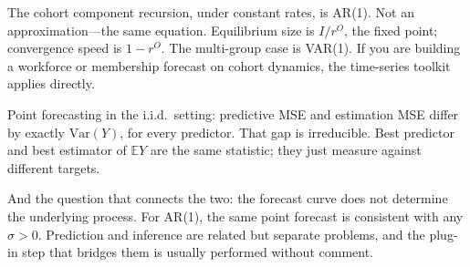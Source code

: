 \documentclass[a4paper,oneside,12pt]{extarticle}
\theoremstyle{plain}
\theoremstyle{definition}
\theoremstyle{remark}
\newcommand*{\E}{\mathbb{E}}
\begin{document}
The cohort component recursion, under constant rates, is AR(1). Not an
approximation---the same equation. Equilibrium size is $I/r^O$, the fixed
point; convergence speed is $1-r^O$. The multi-group case is VAR(1). If
you are building a workforce or membership forecast on cohort dynamics,
the time-series toolkit applies directly.

Point forecasting in the i.i.d.\ setting: predictive MSE and estimation
MSE differ by exactly $\mathrm{Var}(Y)$, for every predictor. That gap
is irreducible. Best predictor and best estimator of $\E Y$ are the same
statistic; they just measure against different targets.

And the question that connects the two: the forecast curve does not
determine the underlying process. For AR(1), the same point forecast is
consistent with any $\sigma > 0$. Prediction and inference are related
but separate problems, and the plug-in step that bridges them is usually
performed without comment.
\end{document}
